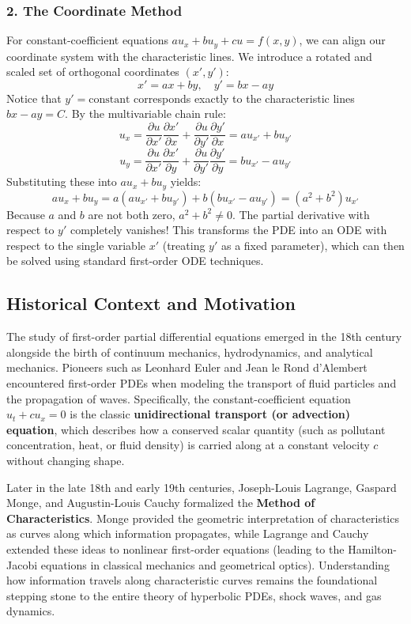 \documentclass[11pt]{article}
\begin{document}
\subsubsection*{2. The Coordinate Method}
For constant-coefficient equations $au_x + bu_y + cu = f(x, y)$, we can align our coordinate system with the characteristic lines. We introduce a rotated and scaled set of orthogonal coordinates $(x', y')$:
\[
x' = ax + by, \quad y' = bx - ay
\]
Notice that $y' = \text{constant}$ corresponds exactly to the characteristic lines $bx - ay = C$. By the multivariable chain rule:
\[
u_x = \frac{\partial u}{\partial x'}\frac{\partial x'}{\partial x} + \frac{\partial u}{\partial y'}\frac{\partial y'}{\partial x} = a u_{x'} + b u_{y'}
\]
\[
u_y = \frac{\partial u}{\partial x'}\frac{\partial x'}{\partial y} + \frac{\partial u}{\partial y'}\frac{\partial y'}{\partial y} = b u_{x'} - a u_{y'}
\]
Substituting these into $au_x + bu_y$ yields:
\[
au_x + bu_y = a(au_{x'} + bu_{y'}) + b(bu_{x'} - au_{y'}) = (a^2 + b^2)u_{x'}
\]
Because $a$ and $b$ are not both zero, $a^2 + b^2 \neq 0$. The partial derivative with respect to $y'$ completely vanishes! This transforms the PDE into an ODE with respect to the single variable $x'$ (treating $y'$ as a fixed parameter), which can then be solved using standard first-order ODE techniques.

\subsection{Historical Context and Motivation}
The study of first-order partial differential equations emerged in the 18th century alongside the birth of continuum mechanics, hydrodynamics, and analytical mechanics. Pioneers such as Leonhard Euler and Jean le Rond d'Alembert encountered first-order PDEs when modeling the transport of fluid particles and the propagation of waves. Specifically, the constant-coefficient equation $u_t + cu_x = 0$ is the classic \textbf{unidirectional transport (or advection) equation}, which describes how a conserved scalar quantity (such as pollutant concentration, heat, or fluid density) is carried along at a constant velocity $c$ without changing shape.

Later in the late 18th and early 19th centuries, Joseph-Louis Lagrange, Gaspard Monge, and Augustin-Louis Cauchy formalized the \textbf{Method of Characteristics}. Monge provided the geometric interpretation of characteristics as curves along which information propagates, while Lagrange and Cauchy extended these ideas to nonlinear first-order equations (leading to the Hamilton-Jacobi equations in classical mechanics and geometrical optics). Understanding how information travels along characteristic curves remains the foundational stepping stone to the entire theory of hyperbolic PDEs, shock waves, and gas dynamics.
\end{document}
